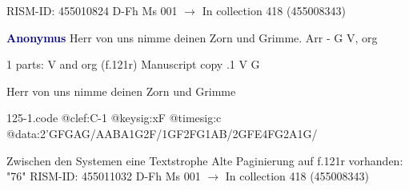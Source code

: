 \documentclass[twocolumn]{book}
\begin{document}
\newline RISM-ID: 455010824
\newline D-Fh  Ms 001
\newline $\rightarrow$ In collection 418 (455008343)
      
\newline \par \vspace{7pt} \textcolor{darkblue}{\textbf{Anonymus  }}
\newline Herr von uns nimme deinen Zorn und Grimme. Arr - G
\newline V, org
\newline \begin{itshape}\end{itshape} 
\newline \textcolor{darkblue}{}  1 parts: V and org  (f.121r)
\newline Manuscript copy
.1  V  G
\newline \begin{footnotesize} Herr von uns nimme deinen Zorn und Grimme \end{footnotesize}  
\begin{filecontents*}{125-1.code}
@clef:C-1
@keysig:xF
@timesig:c
@data:2'GFGAG/AABA1G2F/1GF2FG1AB/2GFE4FG2A1G/
\end{filecontents*}
\newline
%

\newline Zwischen den Systemen eine Textstrophe
\newline Alte Paginierung auf f.121r vorhanden: "76"
\newline RISM-ID: 455011032
\newline D-Fh  Ms 001
\newline $\rightarrow$ In collection 418 (455008343)
      
\end{document}
